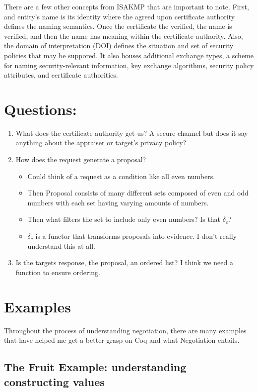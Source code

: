 \documentclass[10pt]{report}
\begin{document}
There are a few other concepts from ISAKMP that are important to note.
First, and entity's name is its identity where the agreed upon certificate
authority defines the naming semantics. Once the certificate the verified,
the name is verified, and then the name has meaning within the
certificate authority. Also, the domain of interpretation (DOI) defines the
situation and set of security policies that may be suppored. It also houses
additional exchange types, a scheme for naming security-relevant information,
key exchange algorithms, security policy attributes, and certificate authorities. 

\section {Questions:}
\begin{enumerate}
  \item What does the certificate authority get us? A secure channel but 
        does it say anything about the appraiser or target's
        privacy policy?
  \item How does the request generate a proposal? 
  \begin{itemize}
    \item Could think of a request as a condition like all even numbers.
    \item Then Proposal consists of many different sets composed of even
          and odd numbers with each set having varying amounts of numbers.
    \item Then what filters the set to include only even numbers?
          Is that $\delta_c$?
    \item $\delta_c$ is a functor that transforms proposals into evidence.
          I don't really understand this at all.  
  \end{itemize}
  \item Is the targets response, the proposal, an ordered list?
        I think we need a function to ensure ordering.
\end{enumerate}

\section {Examples}

Throughout the process of understanding negotiation, there are many
examples that have helped me get a better grasp on Coq and what Negotiation
entails. 

\subsection {The Fruit Example: understanding constructing values}
\end{document}
